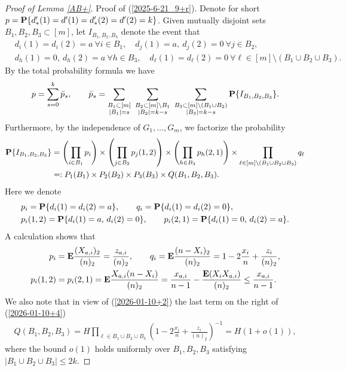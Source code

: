 \documentclass[11pt, a4paper]{article}
\newcommand{\E}{{\bf{E}}}
\newcommand{\PP}{{\bf{P}}}
\begin{document}
\begin{proof}[ Proof of Lemma \ref{AB+}]
Proof of (\ref{2025-6-21_9+r}). Denote for short
$p=\PP\{d'_*(1)=d'(1)=d'_*(2)=d'(2)=k\}$.
Given mutually disjoint sets $B_1,B_2,B_3\subset [m]$, let 
$I_{B_1,B_2,B_3}$
denote the event that
\begin{align*}
&
d_i(1)=d_i(2)=a
\
 \forall i\in B_1,
\quad
d_j(1)=a, 
\
d_j(2)=0
\
 \forall j\in B_2,
\\
&
d_h(1)=0, 
\ 
d_h(2)=a
\
 \forall h\in B_3,
\quad
d_\ell(1)=d_\ell(2)=0
\
\forall \ell\in [m]\setminus (B_1\cup B_2\cup B_3).
 \end{align*}
By the total probability formula we have 
\begin{align*}
p
=
\sum_{s=0}^k{\bar p}_s,
\qquad
{\bar p}_s
=
\sum_
{\substack{B_1\subset [m]\\ |B_1|=s}}
\
\sum_{\substack{B_2\subset [m]\setminus B_1\\
|B_2|=k-s}}
\
\sum_{\substack{B_3\subset [m]\setminus (B_1\cup B_2)\\
|B_3|=k-s}}
\PP\{I_{B_1,B_2,B_3}\}.
\end{align*} 
Furthermore, by the independence of $G_1,\dots, G_m$,
we factorize the probability 
\begin{align}
\nonumber
\PP\{I_{B_1,B_2,B_3}\}
&=
\left(
\prod_{i\in B_1}
p_i
\right)
\times
\left(
\prod_{j\in B_2}p_j(1,2)
\right)
\times
\left(
\prod_{h\in B_3}p_h(2,1)
\right)
\times
\prod_{\ell\in [m]\setminus(B_1\cup B_2\cup B_3)}
q_\ell
\\
\label{2026-01-10+4}
&
=:
P_1(B_1)
\times
P_2(B_2)
\times
P_3(B_3)
\times
Q(B_1,B_2,B_3).
\end{align}
Here we denote
 \begin{align*}
&
p_i=\PP\{d_i(1)=d_i(2)=a\},
\qquad
q_i=\PP\{d_i(1)=d_i(2)=0\},
\\
&
p_i(1,2)=\PP\{d_i(1)=a, \,d_i(2)=0\},
\qquad
p_i(2,1)=\PP\{d_i(1)=0,\, d_i(2)=a\}.
\end{align*}
A calculation shows that
\begin{align*}
p_i
&
=
\E \frac{(X_{a,i})_2}{(n)_2}=\frac{z_{a,i}}{(n)_2},
\qquad
q_i
=
\E\frac{(n-X_i)_2}{(n)_2}
=1-2\frac{x_i}{n}+\frac{z_i}{(n)_2},
\\
p_i(1,2)
&
=
p_i(2,1)
=
\E\frac{X_{a,i}(n-X_i)}{(n)_2}
=
\frac{x_{a,i}}{n-1}-\frac{\E (X_iX_{a,i})}{(n)_2}
\le 
\frac{x_{a,i}}{n-1}.
\end{align*}
We also note that in view of (\ref{2026-01-10+2})  the last term on the right of (\ref{2026-01-10+4})
\begin{align}
\label{2026-01-12+5}
Q(B_1,B_2,B_3)
=
H\prod_{\ell\in B_1\cup B_2\cup B_3}
\left(
1-2\frac{x_i}{n}+\frac{z_i}{(n)_2}
\right)^{-1}
=
H
(1+o(1)),
\end{align}
where the bound $o(1)$ holds
uniformly over $B_1,B_2,B_3$ satisfying $|B_1\cup B_2\cup B_3|\le 2k$.




\end{proof}
\end{document}
